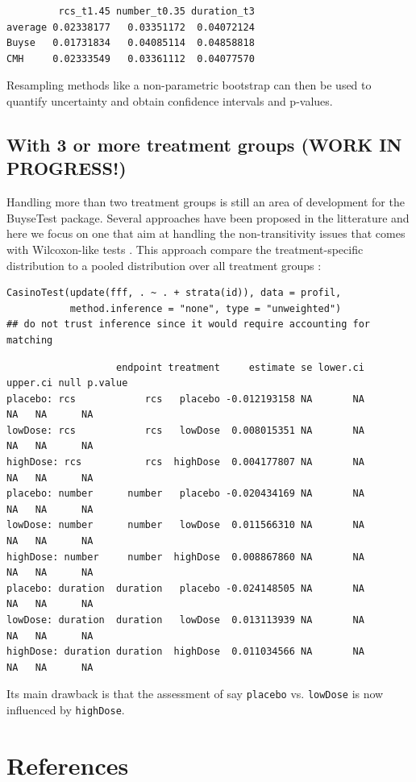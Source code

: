 \documentclass[12pt]{article}
\begin{document}
\begin{verbatim}
         rcs_t1.45 number_t0.35 duration_t3
average 0.02338177   0.03351172  0.04072124
Buyse   0.01731834   0.04085114  0.04858818
CMH     0.02333549   0.03361112  0.04077570
\end{verbatim}


Resampling methods like a non-parametric bootstrap can then be used to
quantify uncertainty and obtain confidence intervals and p-values.

\clearpage

\subsection{With 3 or more treatment groups (WORK IN PROGRESS!)}
\label{sec:org1312e93}

Handling more than two treatment groups is still an area of
development for the BuyseTest package. Several approaches have been
proposed in the litterature and here we focus on one that aim at
handling the non-transitivity issues that comes with Wilcoxon-like
tests \citep{lumley2016characterising}. This approach compare the
treatment-specific distribution to a pooled distribution over all
treatment groups \citep{thangavelu2007wilcoxon}:

\lstset{language=r,label= ,caption= ,captionpos=b,numbers=none}
\begin{lstlisting}
CasinoTest(update(fff, . ~ . + strata(id)), data = profil,
           method.inference = "none", type = "unweighted")
## do not trust inference since it would require accounting for matching
\end{lstlisting}

\begin{verbatim}
                   endpoint treatment     estimate se lower.ci upper.ci null p.value
placebo: rcs            rcs   placebo -0.012193158 NA       NA       NA   NA      NA
lowDose: rcs            rcs   lowDose  0.008015351 NA       NA       NA   NA      NA
highDose: rcs           rcs  highDose  0.004177807 NA       NA       NA   NA      NA
placebo: number      number   placebo -0.020434169 NA       NA       NA   NA      NA
lowDose: number      number   lowDose  0.011566310 NA       NA       NA   NA      NA
highDose: number     number  highDose  0.008867860 NA       NA       NA   NA      NA
placebo: duration  duration   placebo -0.024148505 NA       NA       NA   NA      NA
lowDose: duration  duration   lowDose  0.013113939 NA       NA       NA   NA      NA
highDose: duration duration  highDose  0.011034566 NA       NA       NA   NA      NA
\end{verbatim}

Its main drawback is that the assessment of say \texttt{placebo}
vs. \texttt{lowDose} is now influenced by \texttt{highDose}.


\section*{References}
\label{sec:org60138e7}
\begingroup
\renewcommand{\section}[2]{}




\endgroup
\end{document}
